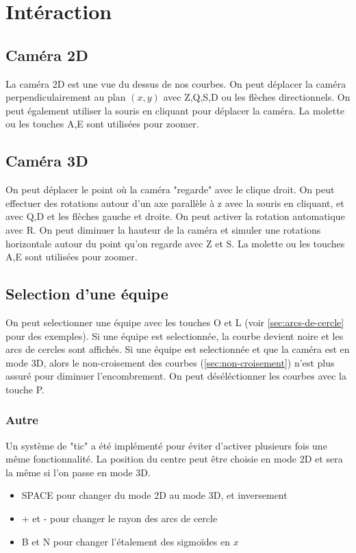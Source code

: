 \documentclass[a4paper,10.5pt]{report}
\begin{document}
    \chapter{Intéraction}\label{ch:intéraction}

    \section{Caméra 2D}\label{sec:caméra-2d}
    La caméra 2D est une vue du dessus de nos courbes.
    On peut déplacer la caméra perpendiculairement au plan $(x,y)$ avec Z,Q,S,D ou les flèches directionnels.
    On peut également utiliser la souris en cliquant pour déplacer la caméra.
    La molette ou les touches A,E sont utilisées pour zoomer.
    \section{Caméra 3D}\label{sec:caméra-3d}
    On peut déplacer le point où la caméra "regarde" avec le clique droit.
    On peut effectuer des rotations autour d'un axe parallèle à z avec la souris en cliquant, et avec Q,D et les flèches gauche et droite.
    On peut activer la rotation automatique avec R\@.
    On peut diminuer la hauteur de la caméra et simuler une rotations horizontale autour du point qu'on regarde avec Z et S\@.
    La molette ou les touches A,E sont utilisées pour zoomer.
    \section{Selection d'une équipe}\label{sec:selection-d'une-équipe}
    On peut selectionner une équipe avec les touches O et L (voir \ref{sec:arcs-de-cercle} pour des exemples).
    Si une équipe est selectionnée, la courbe devient noire et les arcs de cercles sont affichés.
    Si une équipe est selectionnée et que la caméra est en mode 3D, alors le non-croisement des courbes (\ref{sec:non-croisement}) n'est plus assuré pour diminuer l'encombrement.
    On peut déséléctionner les courbes avec la touche P\@.
    \subsection*{Autre}\label{subsec:autre}
    Un système de "tic" a été implémenté pour éviter d'activer plusieurs fois une même fonctionnalité.
    La position du centre peut être choisie en mode 2D et sera la même si l'on passe en mode 3D\@.
    \begin{itemize}
        \item SPACE pour changer du mode 2D au mode 3D, et inversement
        \item + et - pour changer le rayon des arcs de cercle
        \item B et N pour changer l'étalement des sigmoïdes en $x$
    \end{itemize}
\end{document}
